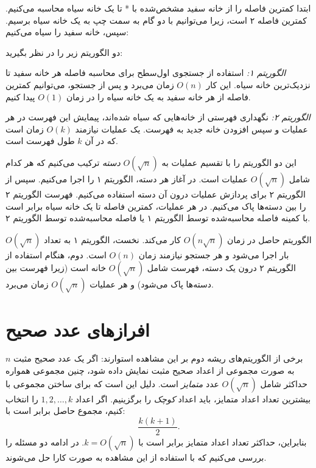 ابتدا کمترین فاصله را از خانه سفید مشخص‌شده با * تا یک خانه سیاه محاسبه می‌کنیم.
کمترین فاصله ۲ است، زیرا می‌توانیم با دو گام به سمت چپ به یک خانه سیاه برسیم.
سپس، خانه سفید را سیاه می‌کنیم:

\begin{center}
\end{center}

دو الگوریتم زیر را در نظر بگیرید:

\emph{الگوریتم ۱:} استفاده از جستجوی اول‌سطح
برای محاسبه فاصله هر خانه سفید تا نزدیک‌ترین خانه سیاه.
این کار $O(n)$ زمان می‌برد و پس از جستجو،
می‌توانیم کمترین فاصله از هر خانه سفید به یک خانه سیاه را در زمان $O(1)$ پیدا کنیم.

\emph{الگوریتم ۲:} نگهداری فهرستی از خانه‌هایی که
سیاه شده‌اند، پیمایش این فهرست در هر عملیات
و سپس افزودن خانه جدید به فهرست.
یک عملیات نیازمند $O(k)$ زمان است که در آن $k$ طول فهرست است.

این دو الگوریتم را با تقسیم عملیات به
$O(\sqrt n)$ \emph{دسته} ترکیب می‌کنیم که هر کدام شامل
$O(\sqrt n)$ عملیات است.
در آغاز هر دسته،
الگوریتم ۱ را اجرا می‌کنیم.
سپس از الگوریتم ۲ برای پردازش عملیات
درون آن دسته استفاده می‌کنیم.
فهرست الگوریتم ۲ را بین دسته‌ها پاک می‌کنیم.
در هر عملیات،
کمترین فاصله تا یک خانه سیاه برابر است با کمینه فاصله محاسبه‌شده توسط الگوریتم ۱
یا فاصله محاسبه‌شده توسط الگوریتم ۲.

الگوریتم حاصل در زمان $O(n \sqrt n)$ کار می‌کند.
نخست، الگوریتم ۱ به تعداد $O(\sqrt n)$ بار اجرا می‌شود
و هر جستجو نیازمند زمان $O(n)$ است.
دوم، هنگام استفاده از الگوریتم ۲ درون یک دسته،
فهرست شامل $O(\sqrt n)$ خانه است
(زیرا فهرست بین دسته‌ها پاک می‌شود)
و هر عملیات $O(\sqrt n)$ زمان می‌برد.

\section{افرازهای عدد صحیح}

برخی از الگوریتم‌های ریشه دوم بر این مشاهده استوارند:
اگر یک عدد صحیح مثبت $n$ به صورت مجموعی از اعداد صحیح مثبت نمایش داده شود،
چنین مجموعی همواره حداکثر شامل $O(\sqrt n)$ عدد \emph{متمایز} است.
دلیل این است که برای ساختن مجموعی با بیشترین تعداد اعداد متمایز،
باید اعداد \emph{کوچک} را برگزینیم.
اگر اعداد $1,2,\ldots,k$ را انتخاب کنیم،
مجموع حاصل برابر است با:
\[\frac{k(k+1)}{2}.\]
بنابراین، حداکثر تعداد اعداد متمایز برابر است با $k = O(\sqrt n)$.
در ادامه دو مسئله را بررسی می‌کنیم که با استفاده از این مشاهده به صورت کارا حل می‌شوند.

